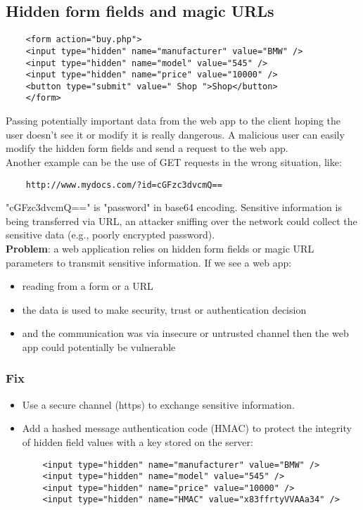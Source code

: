 \documentclass[a4paper, 10pt, titlepage]{article}
\begin{document}
\subsection{Hidden form fields and magic URLs}
\begin{lstlisting}
	<form action="buy.php">
	<input type="hidden" name="manufacturer" value="BMW" />
	<input type="hidden" name="model" value="545" />
	<input type="hidden" name="price" value="10000" />
	<button type="submit" value=" Shop ">Shop</button>
	</form>
\end{lstlisting}
Passing potentially important data from the web app to the client hoping the user doesn’t see it or modify it is really dangerous. A malicious user can easily modify the hidden form fields and send a request to the web app.\medskip\\
Another example can be the use of GET requests in the wrong situation, like:
\begin{lstlisting}
	http://www.mydocs.com/?id=cGFzc3dvcmQ==
\end{lstlisting}
"cGFzc3dvcmQ==" is "password" in base64 encoding. Sensitive information is being transferred via URL, an attacker sniffing over the network could collect the sensitive data (e.g., poorly encrypted password). \medskip\\
\textbf{Problem}: a web application relies on hidden form fields or magic URL parameters to transmit sensitive information. If we see a web app:
\begin{itemize}
\item reading from a form or a URL
\item the data is used to make security, trust or authentication decision
\item and the communication was via insecure or untrusted channel then the web app could potentially be vulnerable
\end{itemize}

\subsubsection*{Fix}
\begin{itemize}
\item Use a secure channel (https) to exchange sensitive information.
\item Add a hashed message authentication code (HMAC) to protect the integrity of hidden field values with a key stored on the server:
\begin{lstlisting}
	<input type="hidden" name="manufacturer" value="BMW" />
	<input type="hidden" name="model" value="545" />
	<input type="hidden" name="price" value="10000" />
	<input type="hidden" name="HMAC" value="x83ffrtyVVAAa34" />	
\end{lstlisting}
\end{itemize}
\end{document}
